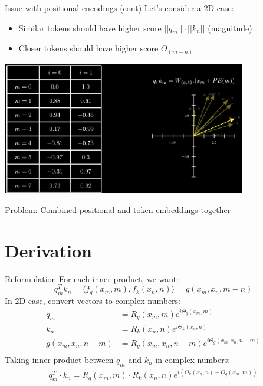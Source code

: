 \documentclass{beamer}
\begin{document}
\begin{frame}[t]{Issue with positional encodings (cont)}
    Let's consider a 2D case:
    \begin{itemize}[label=-]
        \item Similar tokens should have higher score $||q_m|| \cdot ||k_n||$ (magnitude) 
        \item Closer tokens should have higher score $\Theta_{(m-n)}$
    \end{itemize}
    \begin{center}
        \includegraphics[width=0.8\textwidth]{./img/rope_2.png}
    \end{center}
    Problem: Combined positional and token embeddings together
\end{frame}
\section{Derivation}
\begin{frame}[t]{Reformulation}
    For each inner product, we want: \[q_m^T k_n = \langle f_q(x_m, m), f_k(x_n, n) \rangle = g(x_m, x_n, m - n)\]
    In 2D case, convert vectors to complex numbers:
    \begin{align}
        q_m &= R_q(x_m, m)e^{i \Theta_q(x_m,m)} \\
        k_n &= R_k(x_n, n)e^{i \Theta_k(x_n,n)} \\
        g(x_m, x_n, n - m) &= R_g(x_m, x_n, n - m) e^{i \Theta_g(x_m, x_n, n - m)}\\
    \end{align}
    Taking inner product between $q_m$ and $k_n$ in complex numbers:
    \begin{align}
        q_m^T \cdot k_n = R_q(x_m, m) \cdot R_k(x_n, n) e^{i (\Theta_k(x_n,n) - \Theta_q(x_m,m))}
    \end{align}
\end{frame}
\end{document}
